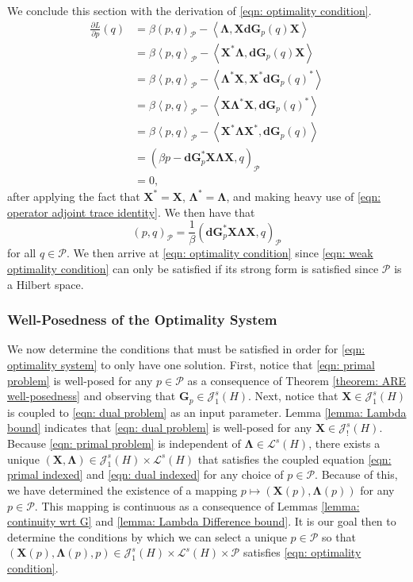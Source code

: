\documentclass{amsart}
\newcommand{\sL}{\mathscr L}
\newcommand{\sJ}{\mathscr J}
\newcommand{\p}[1]{\left( {#1} \right)}
\newcommand{\dual}[1]{\left< #1 \right>}
\newcommand{\sP}{\mathcal{P}}
\newcommand{\bX}{\mathbf X}
\newcommand{\bG}{\mathbf G}
\newcommand{\bLambda}{\boldsymbol{\Lambda}}
\newcommand{\bd}{\mathbf d}
\begin{document}
We conclude this section with the derivation of \eqref{eqn: optimality condition}.
$$
\begin{aligned}
\frac{\partial L}{\partial p}(q) 
&= 
\beta\p{p,q}_{\sP}
-\dual{\bLambda, \bX \bd\bG_p(q)\bX} \\
&=\beta\dual{p,q}_\sP - \dual{\bX^*\bLambda, \bd\bG_p(q)\bX}\\
&=\beta\dual{p,q}_{\sP} - \dual{\bLambda^*\bX, \bX^*\bd\bG_p(q)^*} \\
&=\beta\dual{p,q}_{\sP} - \dual{\bX\bLambda^*\bX,\bd\bG_p(q)^*} \\ 
&=\beta\dual{p,q}_{\sP} - \dual{\bX^*\bLambda\bX^*,\bd\bG_p(q)} \\
&=\p{\beta p-\bd\bG_p^*\bX\bLambda\bX, q}_{\sP} \\
&= 0,
\end{aligned}
$$
after applying the fact that $\bX^* = \bX$, $\bLambda^* = \bLambda$, and making heavy use of \eqref{eqn: operator adjoint trace identity}. We then have that
\begin{equation} \label{eqn: weak optimality condition}
(p,q)_\sP = \frac{1}{\beta}\p{\bd\bG_p^*\bX\bLambda\bX, q}_\sP
\end{equation}
for all $q \in \sP$. We then arrive at \eqref{eqn: optimality condition} since \eqref{eqn: weak optimality condition} can only be satisfied if its strong form is satisfied since $\sP$ is a Hilbert space.

\subsubsection{Well-Posedness of the Optimality System}
\label{subsubsec: well-posedness 1}
We now determine the conditions that must be satisfied in order for \eqref{eqn: optimality system} to only have one solution. First, notice that \eqref{eqn: primal problem} is well-posed for any $p \in \sP$ as a consequence of Theorem \ref{theorem: ARE well-posedness} and observing that $\bG_p \in \sJ_1^s(H)$. Next, notice that $\bX \in \sJ_1^s(H)$ is coupled to \eqref{eqn: dual problem} as an input parameter. Lemma \ref{lemma: Lambda bound} indicates that \eqref{eqn: dual problem} is well-posed for any $\bX\in\sJ_!^s(H)$. Because \eqref{eqn: primal problem} is independent of $\bLambda \in \sL^s(H)$, there exists a unique $\p{\bX, \bLambda} \in \sJ_1^s(H)\times\sL^s(H)$ that satisfies the coupled equation \eqref{eqn: primal indexed} and \eqref{eqn: dual indexed} for any choice of $p \in \sP$. Because of this, we have determined the existence of a mapping $p \mapsto \p{\bX(p),\bLambda(p)}$ for any $p \in \sP$. This mapping is continuous as a consequence of Lemmas \ref{lemma: continuity wrt G} and \ref{lemma: Lambda Difference bound}. It is our goal then to determine the conditions by which we can select a unique $p \in \sP$ so that $\p{\bX(p),\bLambda(p),p} \in \sJ_1^s(H)\times \sL^s(H)\times\sP$ satisfies \eqref{eqn: optimality condition}. 
\end{document}
